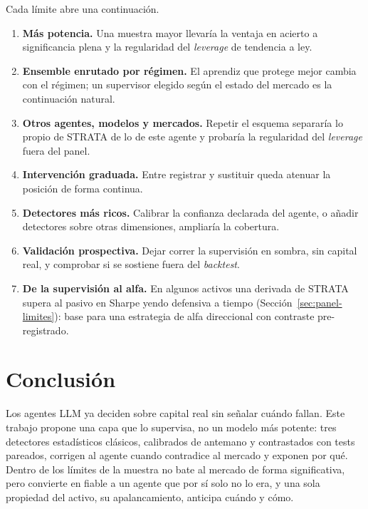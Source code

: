 Cada límite abre una continuación.
\begin{enumerate}
  \item \textbf{Más potencia.} Una muestra mayor llevaría la ventaja en acierto a significancia plena y la regularidad del \emph{leverage} de tendencia a ley.
  \item \textbf{Ensemble enrutado por régimen.} El aprendiz que protege mejor cambia con el régimen; un supervisor elegido según el estado del mercado es la continuación natural.
  \item \textbf{Otros agentes, modelos y mercados.} Repetir el esquema separaría lo propio de STRATA de lo de este agente y probaría la regularidad del \emph{leverage} fuera del panel.
  \item \textbf{Intervención graduada.} Entre registrar y sustituir queda atenuar la posición de forma continua.
  \item \textbf{Detectores más ricos.} Calibrar la confianza declarada del agente, o añadir detectores sobre otras dimensiones, ampliaría la cobertura.
  \item \textbf{Validación prospectiva.} Dejar correr la supervisión en sombra, sin capital real, y comprobar si se sostiene fuera del \emph{backtest}.
  \item \textbf{De la supervisión al alfa.} En algunos activos una derivada de STRATA supera al pasivo en Sharpe yendo defensiva a tiempo (Sección~\ref{sec:panel-limites}): base para una estrategia de alfa direccional con contraste pre-registrado.
\end{enumerate}

\section{Conclusión}
\label{sec:conc-cierre}

Los agentes LLM ya deciden sobre capital real sin señalar cuándo fallan. Este trabajo propone una capa que lo supervisa, no un modelo más potente: tres detectores estadísticos clásicos, calibrados de antemano y contrastados con tests pareados, corrigen al agente cuando contradice al mercado y exponen por qué. Dentro de los límites de la muestra no bate al mercado de forma significativa, pero convierte en fiable a un agente que por sí solo no lo era, y una sola propiedad del activo, su apalancamiento, anticipa cuándo y cómo.
